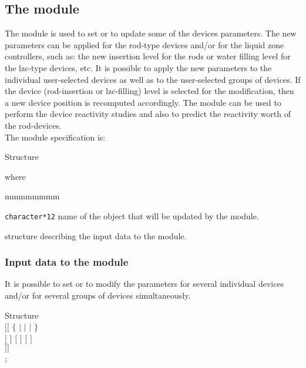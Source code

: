 \subsection{The  module}\label{sect:dset}

\vskip 0.2cm
The  module is used to set or to update some of the devices
parameters. The new parameters can be applied for the rod-type devices
and/or for the liquid zone controllers, such as: the new insertion level for the
rods or water filling level for the lzc-type devices, etc. It is possible to apply
the new parameters to the individual user-selected devices as well as to the
user-selected groups of devices. If the device (rod-insertion or lzc-filling) level
is selected for the modification, then a new device position is recomputed
accordingly. The  module can be used to perform the device
reactivity studies and also to predict the reactivity worth of the rod-devices.\\

\noindent
The  module specification is:

\begin{DataStructure}{Structure }
 \moc{:=} 
 \moc{::} 
\end{DataStructure}

\noindent where

\begin{ListeDeDescription}{mmmmmmmm}

\item[\dusa{DEVICE}] \texttt{character*12} name of the 
object that will be updated by the module.

\item[\dstr{descdset}] structure describing the input data to
the  module. 

\end{ListeDeDescription}

\vskip 0.2cm

\subsubsection{Input data to the  module}\label{sect:dsetstr}

It is possible to set or to modify the parameters for several individual
devices and/or for several groups of devices simultaneously.

\begin{DataStructure}{Structure }
  \\
$[[$  $\{$   $|$  
$|$   $|$   $\}$ \\
$[$   $]$
$[$   $]$
$[$   $]$ \\
   $]]$ \\
;
\end{DataStructure}

